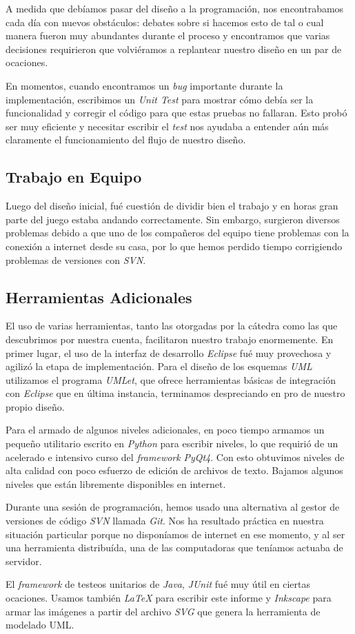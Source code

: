 \documentclass[a4paper,12pt,titlepage]{article}
\begin{document}
A medida que debíamos pasar del diseño a la programación, nos encontrabamos cada día con nuevos obstáculos: debates sobre si hacemos esto de tal o cual manera fueron muy abundantes durante el proceso y encontramos que varias decisiones requirieron que volviéramos a replantear nuestro diseño en un par de ocaciones.

En momentos, cuando encontramos un \emph{bug} importante durante la implementación, escribimos un \emph{Unit Test} para mostrar cómo debía ser la funcionalidad y corregir el código para que estas pruebas no fallaran. Esto probó ser muy eficiente y necesitar escribir el \emph{test} nos ayudaba a entender aún más claramente el funcionamiento del flujo de nuestro diseño.

\subsection{Trabajo en Equipo}

Luego del diseño inicial, fué cuestión de dividir bien el trabajo y en horas gran parte del juego estaba andando correctamente. Sin embargo, surgieron diversos problemas debido a que uno de los compañeros del equipo tiene problemas con la conexión a internet desde su casa, por lo que hemos perdido tiempo corrigiendo problemas de versiones con \emph{SVN}.

\subsection{Herramientas Adicionales}

El uso de varias herramientas, tanto las otorgadas por la cátedra como las que descubrimos por nuestra cuenta, facilitaron nuestro trabajo enormemente. En primer lugar, el uso de la interfaz de desarrollo \emph{Eclipse} fué muy provechosa y agilizó la etapa de implementación. Para el diseño de los esquemas \emph{UML} utilizamos el programa \emph{UMLet}, que ofrece herramientas básicas de integración con \emph{Eclipse} que en última instancia, terminamos despreciando en pro de nuestro propio diseño.

Para el armado de algunos niveles adicionales, en poco tiempo armamos un pequeño utilitario escrito en \emph{Python} para escribir niveles, lo que requirió de un acelerado e intensivo curso del \emph{framework} \emph{PyQt4}. Con esto obtuvimos niveles de alta calidad con poco esfuerzo de edición de archivos de texto. Bajamos algunos niveles que están libremente disponibles en internet.

Durante una sesión de programación, hemos usado una alternativa al gestor de versiones de código \emph{SVN} llamada \emph{Git}. Nos ha resultado práctica en nuestra situación particular porque no disponíamos de internet en ese momento, y al ser una herramienta distribuída, una de las computadoras que teníamos actuaba de servidor.

El \emph{framework} de testeos unitarios de \emph{Java}, \emph{JUnit} fué muy útil en ciertas ocaciones. Usamos también \emph{\LaTeX} para escribir este informe y \emph{Inkscape} para armar las imágenes a partir del archivo \emph{SVG} que genera la herramienta de modelado UML.
\end{document}
